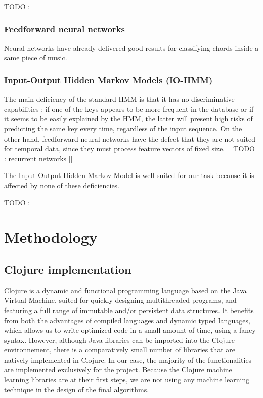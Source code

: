 \documentclass[letterpaper]{article}
\begin{document}
TODO : \citep{JP} \citep{DR}

\subsubsection{Feedforward neural networks}

Neural networks have already delivered good results for classifying chords inside a same piece of music. \citep{JO}

\subsubsection{Input-Output Hidden Markov Models (IO-HMM)}
\label{sssec:iohmm}

The main deficiency of the standard HMM is that it has no discriminative capabilities : if one of the keys appears to be more frequent in the database or
if it seems to be easily explained by the HMM, the latter will present high risks of predicting the same key every time, regardless of the
input sequence. On the other hand, feedforward neural networks have the defect that they are not suited for temporal data, since they must 
process feature vectors of fixed size. [[ TODO : recurrent networks ]]

The Input-Output Hidden Markov Model is well suited for our task because it is affected by none of these deficiencies.

TODO : \citep{YB}

\section{Methodology}


\subsection{Clojure implementation}

Clojure is a dynamic and functional programming language based on the Java Virtual Machine, suited for quickly designing multithreaded programs,
and featuring a full range of immutable and/or persistent data structures. It benefits from both the advantages of compiled languages and dynamic typed
languages, which allows us to write optimized code in a small amount of time, using a fancy syntax. However, although Java libraries can be imported into the Clojure environnement, there is a comparatively small number of libraries that are natively implemented in Clojure. In our case, the majority of the functionalities
are implemented exclusively for the project. Because the Clojure machine learning libraries are at their first steps, we are not using any machine learning 
technique in the design of the final algorithms.\\
\end{document}
